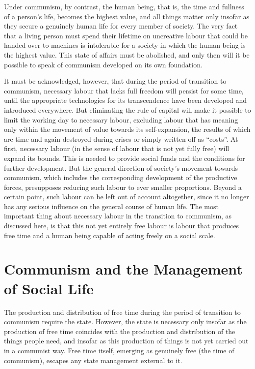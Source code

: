 \documentclass[12pt,a4paper,openany]{book}
\begin{document}
Under communism, by contrast, the human being, that is, the time and fullness of a person’s life, becomes the highest value, and all things matter only insofar as they secure a genuinely human life for every member of society. The very fact that a living person must spend their lifetime on uncreative labour that could be handed over to machines is intolerable for a society in which the human being is the highest value. This state of affairs must be abolished, and only then will it be possible to speak of communism developed on its own foundation.

It must be acknowledged, however, that during the period of transition to communism, necessary labour that lacks full freedom will persist for some time, until the appropriate technologies for its transcendence have been developed and introduced everywhere. But eliminating the rule of capital will make it possible to limit the working day to necessary labour, excluding labour that has meaning only within the movement of value towards its self-expansion, the results of which are time and again destroyed during crises or simply written off as “costs”. At first, necessary labour (in the sense of labour that is not yet fully free) will expand its bounds. This is needed to provide social funds and the conditions for further development. But the general direction of society’s movement towards communism, which includes the corresponding development of the productive forces, presupposes reducing such labour to ever smaller proportions. Beyond a certain point, such labour can be left out of account altogether, since it no longer has any serious influence on the general course of human life. The most important thing about necessary labour in the transition to communism, as discussed here, is that this not yet entirely free labour is labour that produces free time and a human being capable of acting freely on a social scale.
\ifSubfilesClassLoaded{\setcounter{page}{40}}{}
\section{Communism and the Management of Social Life}
\label{sec:07_communism_management}

The production and distribution of free time during the period of transition to communism require the state. However, the state is necessary only insofar as the production of free time coincides with the production and distribution of the things people need, and insofar as this production of things is not yet carried out in a communist way. Free time itself, emerging as genuinely free (the time of communism), escapes any state management external to it.
\end{document}
